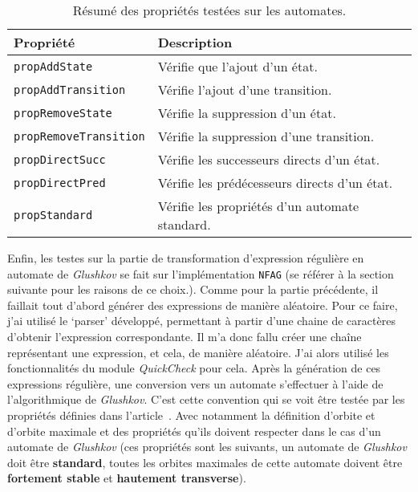 \begin{table}[H]
    \centering
    \begin{tabular}{ll}
        \toprule
        \textbf{Propriété}                         & \textbf{Description}                           \\
        \midrule
        \texttt{propAddState}         & Vérifie que l'ajout d'un état.                 \\
        \texttt{propAddTransition}    & Vérifie l'ajout d'une transition.              \\
        \texttt{propRemoveState}      & Vérifie la suppression d'un état.              \\
        \texttt{propRemoveTransition} & Vérifie la suppression d'une transition.       \\
        \texttt{propDirectSucc}       & Vérifie les successeurs directs d'un état.     \\
        \texttt{propDirectPred}       & Vérifie les prédécesseurs directs d'un état.   \\
        \texttt{propStandard}         & Vérifie les propriétés d'un automate standard. \\
        \bottomrule
    \end{tabular}
    \caption{Résumé des propriétés testées sur les automates.}\label{tab:proprietes}
\end{table}

\vphantom{}

Enfin, les testes sur la partie de transformation d'expression régulière en
automate de \textit{Glushkov} se fait sur l'implémentation
\texttt{NFAG} (se référer à la section suivante pour les raisons de
ce choix.). Comme pour la partie précédente, il faillait tout d'abord générer
des expressions de manière aléatoire. Pour ce faire, j'ai utilisé le `parser'
développé, permettant à partir d'une chaine de caractères d'obtenir l'expression
correspondante. Il m'a donc fallu créer une chaîne représentant une expression,
et cela, de manière aléatoire. J'ai alors utilisé les fonctionnalités du module
\textit{QuickCheck} pour cela. Après la génération de ces expressions régulière,
une conversion vers un automate s'effectuer à l'aide de l'algorithmique de
\textit{Glushkov}. C'est cette convention qui se voit être testée par les
propriétés définies dans l'article~\cite{CaronZiadi2001}. Avec notamment la
définition d'orbite et d'orbite maximale et des propriétés qu'ils doivent
respecter dans le cas d'un automate de \textit{Glushkov} (ces propriétés sont
les suivants, un automate de \textit{Glushkov} doit être \textbf{standard},
toutes les orbites maximales de cette automate doivent être
\textbf{fortement stable} et \textbf{hautement transverse}).

